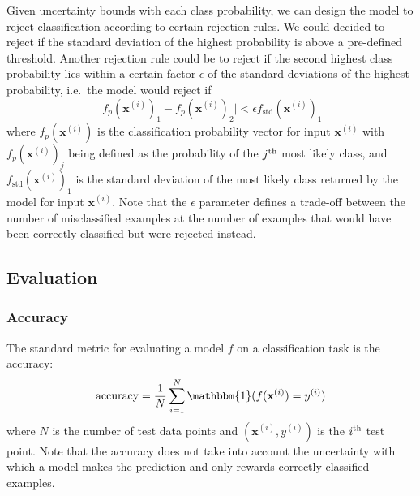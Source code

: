 \documentclass{article}
\begin{document}
Given uncertainty bounds with each class probability, we can design the model to reject classification according to certain rejection rules. We could decided to reject if the standard deviation of the highest probability is above a pre-defined threshold. Another rejection rule could be to reject if the second highest class probability lies within a certain factor $\epsilon$ of the standard deviations of the highest probability, i.e.\ the model would reject if
\begin{equation*}
	\vert f_p(\mathbf{x}^{(i)})_1 - f_p(\mathbf{x}^{(i)})_2 \vert < \epsilon f_{\textrm{std}}(\mathbf{x}^{(i)})_1
\end{equation*}
where $f_p(\mathbf{x}^{(i)})$ is the classification probability vector for input $\mathbf{x}^{(i)}$ with $f_p(\mathbf{x}^{(i)})_j$ being defined as the probability of the $j\textsuperscript{th}$ most likely class, and $f_{\textrm{std}}(\mathbf{x}^{(i)})_1$ is the standard deviation of the most likely class returned by the model for input $\mathbf{x}^{(i)}$. Note that the $\epsilon$ parameter defines a trade-off between the number of misclassified examples at the number of examples that would have been correctly classified but were rejected instead.

\subsection{Evaluation}
\subsubsection{Accuracy}
The standard metric for evaluating a model $f$ on a classification task is the accuracy: 
\begin{equation*}
	\textrm{accuracy} = \frac{1}{N} \sum_{i=1}^N \mathbbm{1}(f(\mathbf{x}^{(i)}) = y^{(i)})
\end{equation*}
where $N$ is the number of test data points and $(\mathbf{x}^{(i)}, y^{(i)})$ is the $i\textsuperscript{th}$ test point. Note that the accuracy does not take into account the uncertainty with which a model makes the prediction and only rewards correctly classified examples.
\end{document}
